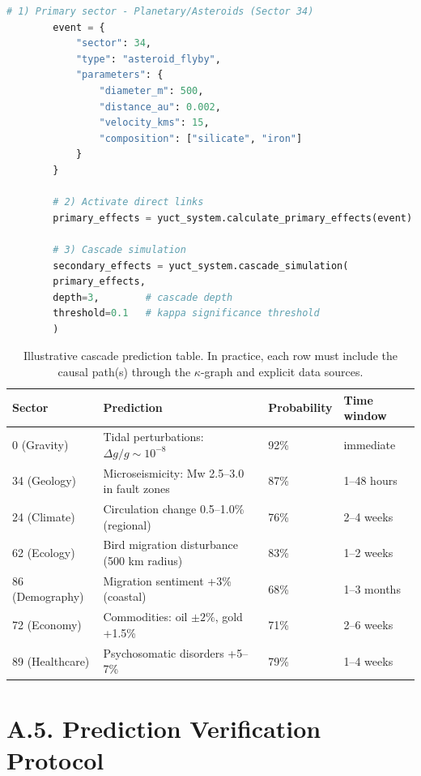 \documentclass[13pt,a4paper]{article}
\begin{document}
	\begin{lstlisting}[language=Python]
		# 1) Primary sector - Planetary/Asteroids (Sector 34)
		event = {
			"sector": 34,
			"type": "asteroid_flyby",
			"parameters": {
				"diameter_m": 500,
				"distance_au": 0.002,
				"velocity_kms": 15,
				"composition": ["silicate", "iron"]
			}
		}
		
		# 2) Activate direct links
		primary_effects = yuct_system.calculate_primary_effects(event)
		
		# 3) Cascade simulation
		secondary_effects = yuct_system.cascade_simulation(
		primary_effects,
		depth=3,        # cascade depth
		threshold=0.1   # kappa significance threshold
		)
	\end{lstlisting}
	
	\begin{table}[htbp]
		\centering
		\small
		\begin{tabular}{p{}p{}p{}p{}}
			\toprule
			\textbf{Sector} & \textbf{Prediction} & \textbf{Probability} & \textbf{Time window} \\
			\midrule
			0 (Gravity) & Tidal perturbations: $\Delta g/g \sim 10^{-8}$ & 92\% & immediate \\
			34 (Geology) & Microseismicity: Mw 2.5--3.0 in fault zones & 87\% & 1--48 hours \\
			24 (Climate) & Circulation change 0.5--1.0\% (regional) & 76\% & 2--4 weeks \\
			62 (Ecology) & Bird migration disturbance (500 km radius) & 83\% & 1--2 weeks \\
			86 (Demography) & Migration sentiment +3\% (coastal) & 68\% & 1--3 months \\
			72 (Economy) & Commodities: oil $\pm 2\%$, gold +1.5\% & 71\% & 2--6 weeks \\
			89 (Healthcare) & Psychosomatic disorders +5--7\% & 79\% & 1--4 weeks \\
			\bottomrule
		\end{tabular}
		\caption{Illustrative cascade prediction table. In practice, each row must include the causal path(s) through the $\kappa$-graph and explicit data sources.}
	\end{table}
	
	\section*{A.5. Prediction Verification Protocol}
	
\end{document}
